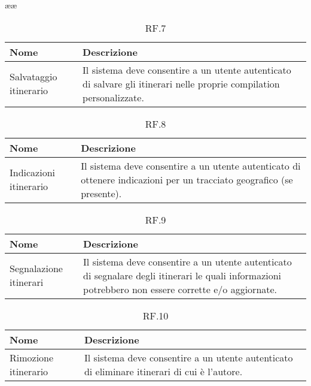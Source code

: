 ææ\documentclass{natourDoc}
\begin{document}
	\begin{table}[H]
		\centering
		\begin{tabular}{ |p{5cm}|p{10.3cm}| }
			\hline
			\rowcolor{PineGreen!70}
			\textbf{Nome} & \textbf{Descrizione} \\
			\hline
			Salvataggio itinerario & Il sistema deve consentire a un utente autenticato di salvare gli itinerari
			nelle proprie compilation personalizzate. \\
			\hline
		\end{tabular}
		\caption{RF.7}
		\label{table:7}
	\end{table}

	\begin{table}[H]
		\centering
		\begin{tabular}{ |p{5cm}|p{10.3cm}| }
			\hline
			\rowcolor{PineGreen!70}
			\textbf{Nome} & \textbf{Descrizione} \\
			\hline
			Indicazioni itinerario & Il sistema deve consentire a un utente autenticato di ottenere indicazioni
			per un tracciato geografico (se presente). \\
			\hline
		\end{tabular}
		\caption{RF.8}
		\label{table:8}
	\end{table}

	\begin{table}[H]
		\centering
		\begin{tabular}{ |p{5cm}|p{10.3cm}| }
			\hline
			\rowcolor{PineGreen!70}
			\textbf{Nome} & \textbf{Descrizione} \\
			\hline
			Segnalazione itinerari & Il sistema deve consentire a un utente autenticato di segnalare degli itinerari
			le quali informazioni potrebbero non essere corrette e/o aggiornate. \\
			\hline
		\end{tabular}
		\caption{RF.9}
		\label{table:9}
	\end{table}

	\begin{table}[H]
		\centering
		\begin{tabular}{ |p{5cm}|p{10.3cm}| }
			\hline
			\rowcolor{PineGreen!70}
			\textbf{Nome} & \textbf{Descrizione} \\
			\hline
			Rimozione itinerario & Il sistema deve consentire a un utente autenticato di eliminare itinerari di cui
			è l'autore. \\
			\hline
		\end{tabular}
		\caption{RF.10}
		\label{table:10}
	\end{table}
	
\end{document}
